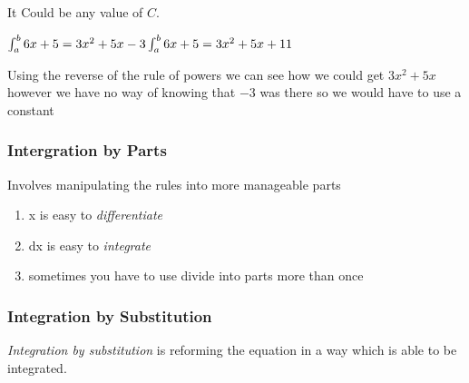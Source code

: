 \documentclass{article}
\begin{document}
It Could be any value of $C$.

$\int_a^b 6x + 5 = 3x^{2}+5x-3 \\
\int_a^b 6x + 5 = 3x^{2} + 5x + 11 \\
$

Using the reverse of the rule of powers we can see how we could get  $3x^{2} + 5x $ however we have no way of knowing that $-3$ was there so we would have to use a constant 

\subsubsection{Intergration by Parts}
Involves manipulating the rules into more manageable parts
\begin{enumerate}
\item x is easy to \textit{differentiate}
\item dx is easy to \textit{integrate}
\item sometimes you have to use divide into parts more than once
\end{enumerate} 


\subsubsection{Integration by Substitution}
\textit{Integration by substitution} is reforming the equation in a way which is able to be integrated. 
\end{document}
